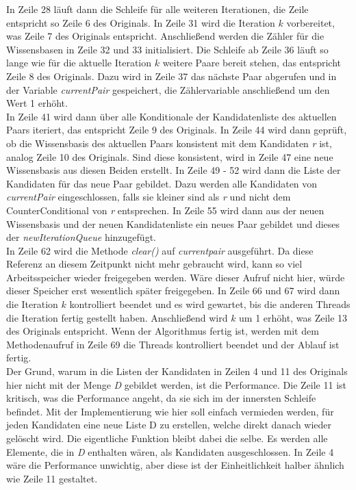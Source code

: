 \documentclass[12pt,a4paper]{article}
\begin{document}
In Zeile 28 läuft dann die Schleife für alle weiteren Iterationen, die Zeile entspricht so Zeile 6 des Originals. In Zeile 31 wird die Iteration $k$ vorbereitet, was Zeile 7 des Originals entspricht. Anschließend werden die Zähler für die Wissensbasen in Zeile 32 und 33 initialisiert. Die Schleife ab Zeile 36 läuft so lange wie für die aktuelle Iteration $k$ weitere Paare bereit stehen, das entspricht Zeile 8 des Originals. Dazu wird in Zeile 37 das nächste Paar abgerufen und in der Variable \textit{currentPair} gespeichert, die Zählervariable anschließend um den Wert 1 erhöht. \\
In Zeile 41 wird dann über alle Konditionale der Kandidatenliste des aktuellen Paars iteriert, das entspricht Zeile 9 des Originals. In Zeile 44 wird dann geprüft, ob die Wissensbasis des aktuellen Paars konsistent mit dem Kandidaten \textit{r} ist, analog Zeile 10 des Originals. Sind diese konsistent, wird in Zeile 47 eine neue Wissensbasis aus diesen Beiden erstellt. In Zeile 49 - 52 wird dann die Liste der Kandidaten für das neue Paar gebildet. Dazu werden alle Kandidaten von \textit{currentPair} eingeschlossen, falls sie kleiner sind als \textit{r} und nicht dem CounterConditional von \textit{r} entsprechen. In Zeile 55 wird dann aus der neuen Wissensbasis und der neuen Kandidatenliste ein neues Paar gebildet und dieses der \textit{newIterationQueue} hinzugefügt. \\
In Zeile 62 wird die Methode \textit{clear()} auf \textit{currentpair} ausgeführt. Da diese Referenz  an diesem Zeitpunkt nicht mehr gebraucht wird, kann so viel Arbeitsspeicher wieder freigegeben werden. Wäre dieser Aufruf nicht hier, würde dieser Speicher erst wesentlich später freigegeben. In Zeile 66 und 67 wird dann die Iteration $k$ kontrolliert beendet und es wird gewartet, bis die anderen Threads die Iteration fertig gestellt haben. Anschließend wird $k$ um 1 erhöht, was Zeile 13 des Originals entspricht. Wenn der Algorithmus fertig ist, werden mit dem Methodenaufruf in Zeile 69 die Threads kontrolliert beendet und der Ablauf ist fertig. \\
Der Grund, warum in die Listen der Kandidaten in Zeilen 4 und 11 des Originals hier nicht mit der Menge \textit{D} gebildet werden, ist die Performance. Die Zeile 11 ist kritisch, was die Performance angeht, da sie sich im der innersten Schleife befindet. Mit der Implementierung wie hier soll einfach vermieden werden, für jeden Kandidaten eine neue Liste D zu erstellen, welche direkt danach wieder gelöscht wird. Die eigentliche Funktion bleibt dabei die selbe. Es werden alle Elemente, die in \textit{D} enthalten wären, als Kandidaten ausgeschlossen. In Zeile 4 wäre die Performance unwichtig, aber diese ist der Einheitlichkeit halber ähnlich wie Zeile 11 gestaltet. \\
\end{document}
